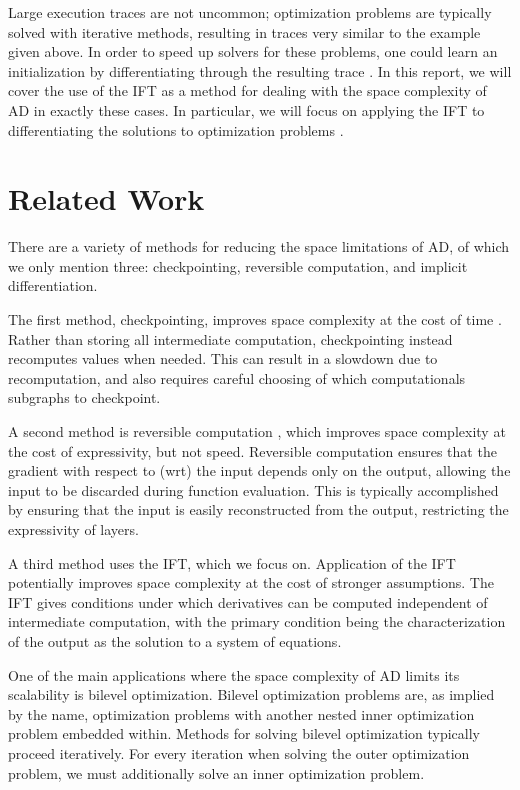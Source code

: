\documentclass[11pt]{article}
\begin{document}
Large execution traces are not uncommon;
optimization problems are typically solved with iterative methods,
resulting in traces very similar to the example given above.
In order to speed up solvers for these problems,
one could learn an initialization by differentiating through the
resulting trace \citep{finn2017maml,kim2018savi,neuralinit}.
In this report, we will cover the use of the IFT
as a method for dealing with the space complexity of AD in exactly these cases.
In particular,
we will focus on applying the IFT to differentiating the solutions to optimization problems
\citep{optnet,agrawal2019diffcvx}.

\section{Related Work}
There are a variety of methods for reducing the space limitations of AD,
of which we only mention three: checkpointing, reversible computation, and implicit differentiation.

The first method, checkpointing, improves space complexity at the cost of time \citep{griewank2008autodiff}.
Rather than storing all intermediate computation,
checkpointing instead recomputes values when needed.
This can result in a slowdown due to recomputation,
and also requires careful choosing of which computationals subgraphs to checkpoint.

A second method is reversible computation \citep{maclaurin2015reversible,gomez2017reversible},
which improves space complexity at the cost of expressivity, but not speed.
Reversible computation ensures that the gradient with respect to (wrt) the
input depends only on the output,
allowing the input to be discarded during function evaluation.
This is typically accomplished by ensuring that the input is easily reconstructed from the output,
restricting the expressivity of layers.

A third method uses the IFT, which we focus on.
Application of the IFT potentially improves space complexity at the cost of stronger assumptions.
The IFT gives conditions under which derivatives can be computed independent of
intermediate computation,
with the primary condition being the characterization of the output as the solution
to a system of equations.

One of the main applications where the space complexity of AD limits its scalability
is bilevel optimization.
Bilevel optimization problems are, as implied by the name,
optimization problems with another nested inner optimization problem embedded within.
Methods for solving bilevel optimization typically proceed iteratively.
For every iteration when solving the outer optimization problem,
we must additionally solve an inner optimization problem.
\end{document}
